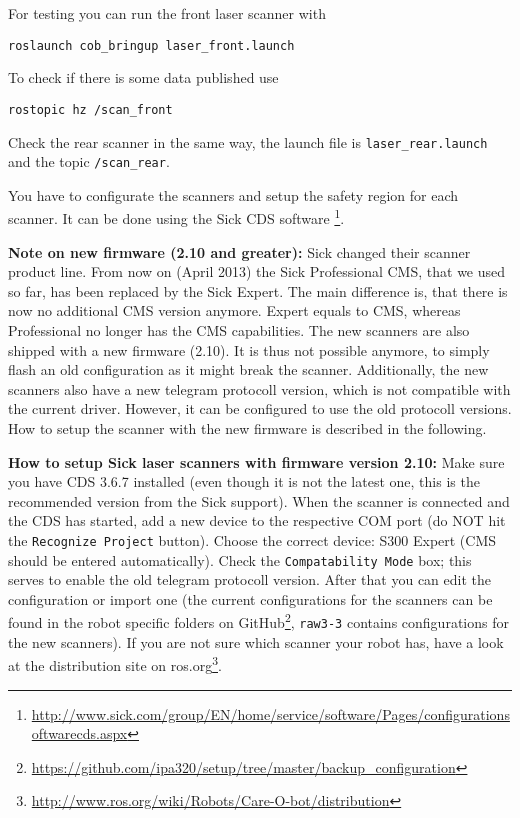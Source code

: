 For testing you can run the front laser scanner with
\begin{lstlisting}
roslaunch cob_bringup laser_front.launch
\end{lstlisting}

To check if there is some data published use
\begin{lstlisting}
rostopic hz /scan_front
\end{lstlisting}

Check the rear scanner in the same way, the launch file is \texttt{laser\_rear.launch} and the topic \texttt{/scan\_rear}.

You have to configurate the scanners and setup the safety region for each scanner. It can be done using the Sick CDS software \footnote{\url{http://www.sick.com/group/EN/home/service/software/Pages/configurationsoftwarecds.aspx}}.

\textbf{Note on new firmware (2.10 and greater):} 
Sick changed their scanner product line. From now on (April 2013) the Sick Professional CMS, that we used so far, has been replaced by the Sick Expert.
The main difference is, that there is now no additional CMS version anymore.
Expert equals to CMS, whereas Professional no longer has the CMS capabilities.
The new scanners are also shipped with a new firmware (2.10).
It is thus not possible anymore, to simply flash an old configuration as it might break the scanner.
Additionally, the new scanners also have a new telegram protocoll version, which is not compatible with the current driver.
However, it can be configured to use the old protocoll versions.
How to setup the scanner with the new firmware is described in the following.

\textbf{How to setup Sick laser scanners with firmware version 2.10:}
Make sure you have CDS 3.6.7 installed (even though it is not the latest one, this is the recommended version from the Sick support).
When the scanner is connected and the CDS has started, add a new device to the respective COM port (do NOT hit the \texttt{Recognize Project} button).
Choose the correct device: S300 Expert (CMS should be entered automatically).
Check the \texttt{Compatability Mode} box; this serves to enable the old telegram protocoll version.
After that you can edit the configuration or import one (the current configurations for the scanners can be found in the robot specific folders on GitHub\footnote{\url{https://github.com/ipa320/setup/tree/master/backup_configuration}}, \texttt{raw3-3} contains configurations for the new scanners).
If you are not sure which scanner your robot has, have a look at the distribution site on ros.org\footnote{\url{http://www.ros.org/wiki/Robots/Care-O-bot/distribution}}.

